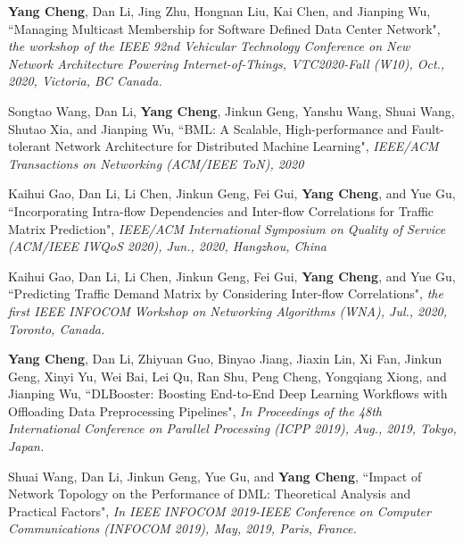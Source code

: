 \documentclass{resume}
\newcommand{\authorlist}[1]{{\textcolor[rgb]{0,0,0}{#1}}}
\newcommand{\papertitle}[1]{{``#1"}}
\newcommand{\publicationaddr}[1]{{\textit{#1}}}
\begin{document}
\begin{enumerate}[label={[\arabic*]}, noitemsep]
	
	\item \authorlist{\textbf{Yang Cheng}, Dan Li, Jing Zhu, Hongnan Liu, Kai Chen, and Jianping Wu}, \papertitle{Managing Multicast Membership for Software Defined Data Center Network}, \publicationaddr{the workshop of the IEEE 92nd Vehicular Technology Conference on New Network Architecture Powering Internet-of-Things, VTC2020-Fall (W10), Oct., 2020, Victoria, BC Canada.}
	
	\item \authorlist{Songtao Wang, Dan Li, \textbf{Yang Cheng}, Jinkun Geng, Yanshu Wang, Shuai Wang, Shutao Xia, and Jianping Wu}, \papertitle{BML: A Scalable, High-performance and Fault-tolerant Network Architecture for Distributed Machine Learning}, \publicationaddr{IEEE/ACM Transactions on Networking (ACM/IEEE ToN), 2020}
	
	\item \authorlist{Kaihui Gao, Dan Li, Li Chen, Jinkun Geng, Fei Gui, \textbf{Yang Cheng}, and Yue Gu}, \papertitle{Incorporating Intra-flow Dependencies and Inter-flow Correlations for Traffic Matrix Prediction}, \publicationaddr{IEEE/ACM International Symposium on Quality of Service (ACM/IEEE IWQoS 2020), Jun., 2020, Hangzhou, China}
	
	\item \authorlist{Kaihui Gao, Dan Li, Li Chen, Jinkun Geng, Fei Gui, \textbf{Yang Cheng}, and Yue Gu}, \papertitle{Predicting Traffic Demand Matrix by Considering Inter-flow Correlations}, \publicationaddr{ the first IEEE INFOCOM Workshop on Networking Algorithms (WNA), Jul., 2020, Toronto, Canada.}
	
	\item \authorlist{\textbf{Yang Cheng}, Dan Li, Zhiyuan Guo, Binyao Jiang, Jiaxin Lin, Xi Fan, Jinkun Geng, Xinyi Yu, Wei Bai, Lei Qu, Ran Shu, Peng Cheng, Yongqiang Xiong, and Jianping Wu}, \papertitle{DLBooster: Boosting End-to-End Deep Learning Workflows with Offloading Data Preprocessing Pipelines}, \publicationaddr{In Proceedings of the 48th International Conference on Parallel Processing (ICPP 2019), Aug., 2019, Tokyo, Japan.}
	
	\item \authorlist{Shuai Wang, Dan Li, Jinkun Geng, Yue Gu, and \textbf{Yang Cheng}}, \papertitle{Impact of Network Topology on the Performance of DML: Theoretical Analysis and Practical Factors}, \publicationaddr{In IEEE INFOCOM 2019-IEEE Conference on Computer Communications (INFOCOM 2019), May, 2019, Paris, France.}
	

\end{enumerate}
\end{document}

